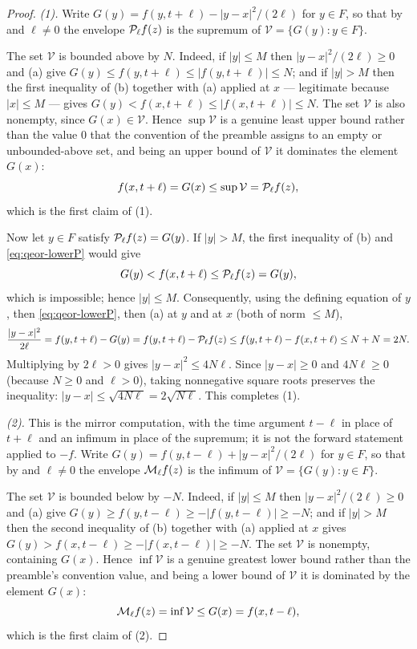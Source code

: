 \begin{proof}
\emph{(1).} Write $G(y)=f(y,t+\ell)-|y-x|^2/(2\ell)$ for $y\in F$, so that by
 and $\ell\ne0$ the envelope $\mathcal{P}_\ell f(z)$ is the supremum
of $\mathcal V=\{G(y):y\in F\}$.

The set $\mathcal V$ is bounded above by $N$. Indeed, if $|y|\le M$ then
$|y-x|^2/(2\ell)\ge0$ and (a) give
$G(y)\le f(y,t+\ell)\le|f(y,t+\ell)|\le N$; and if $|y|>M$ then the first
inequality of (b) together with (a) applied at $x$ — legitimate because
$|x|\le M$ — gives $G(y)<f(x,t+\ell)\le|f(x,t+\ell)|\le N$. The set $\mathcal V$
is also nonempty, since $G(x)\in\mathcal V$. Hence $\sup\mathcal V$ is a genuine
least upper bound rather than the value $0$ that the convention of the preamble
assigns to an empty or unbounded-above set, and being an upper bound of
$\mathcal V$ it dominates the element $G(x)$:
\begin{equation}\label{eq:qeor-lowerP}
  f(x,t+\ell)=G(x)\le\sup\mathcal V=\mathcal{P}_\ell f(z),
\end{equation}
which is the first claim of (1).

Now let $y\in F$ satisfy $\mathcal{P}_\ell f(z)=G(y)$. If $|y|>M$, the first inequality
of (b) and \eqref{eq:qeor-lowerP} would give
\[
  G(y)<f(x,t+\ell)\le\mathcal{P}_\ell f(z)=G(y),
\]
which is impossible; hence $|y|\le M$. Consequently, using the defining equation
of $y$, then \eqref{eq:qeor-lowerP}, then (a) at $y$ and at $x$ (both of norm
$\le M$),
\begin{equation}\label{eq:qeor-collapseP}
  \frac{|y-x|^2}{2\ell}
  =f(y,t+\ell)-G(y)
  =f(y,t+\ell)-\mathcal{P}_\ell f(z)
  \le f(y,t+\ell)-f(x,t+\ell)
  \le N+N=2N .
\end{equation}
Multiplying by $2\ell>0$ gives $|y-x|^2\le4N\ell$. Since $|y-x|\ge0$ and
$4N\ell\ge0$ (because $N\ge0$ and $\ell>0$), taking nonnegative square roots
preserves the inequality:
$|y-x|\le\sqrt{4N\ell}=2\sqrt{N\ell}$. This completes (1).

\emph{(2).} This is the mirror computation, with the time argument $t-\ell$ in
place of $t+\ell$ and an infimum in place of the supremum; it is not the forward
statement applied to $-f$. Write $G(y)=f(y,t-\ell)+|y-x|^2/(2\ell)$ for $y\in F$,
so that by  and $\ell\ne0$ the envelope $\mathcal{M}_\ell f(z)$ is
the infimum of $\mathcal V=\{G(y):y\in F\}$.

The set $\mathcal V$ is bounded below by $-N$. Indeed, if $|y|\le M$ then
$|y-x|^2/(2\ell)\ge0$ and (a) give
$G(y)\ge f(y,t-\ell)\ge-|f(y,t-\ell)|\ge-N$; and if $|y|>M$ then the second
inequality of (b) together with (a) applied at $x$ gives
$G(y)>f(x,t-\ell)\ge-|f(x,t-\ell)|\ge-N$. The set $\mathcal V$ is nonempty,
containing $G(x)$. Hence $\inf\mathcal V$ is a genuine greatest lower bound
rather than the preamble's convention value, and being a lower bound of
$\mathcal V$ it is dominated by the element $G(x)$:
\begin{equation}\label{eq:qeor-upperM}
  \mathcal{M}_\ell f(z)=\inf\mathcal V\le G(x)=f(x,t-\ell),
\end{equation}
which is the first claim of (2).


\end{proof}
